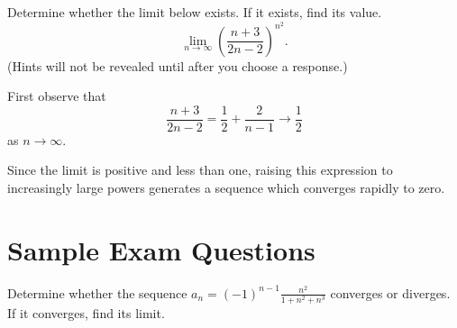 \documentclass{ximera}
\begin{document}
\begin{question}%

Determine whether the limit below exists. If it exists, find its value.
\[\lim_{n \rightarrow \infty} \left(\frac{n + 3}{2n - 2}\right)^{n^2}.\] 
(Hints will not be revealed until after you choose a response.)
\begin{multiplechoice}
\end{multiplechoice}
\begin{feedback}
First observe that 
\[\frac{n + 3}{2n - 2} = \frac{1}{2} + \frac{2}{n - 1} \rightarrow \frac{1}{2}\]
as \(n \rightarrow \infty\). \begin{hint} Since the limit is positive and less than one, raising this expression to increasingly large powers generates a sequence which converges rapidly to zero. \end{hint}
\end{feedback}

\end{question}

\section*{Sample Exam Questions}

\begin{question}%

Determine whether the sequence \(\displaystyle a_n = (-1)^{n-1} \frac{n^2}{1 + n^2 + n^3}\) converges or diverges. If it converges, find its limit.
\begin{multiplechoice}
\end{multiplechoice}

\end{question}
\end{document}
